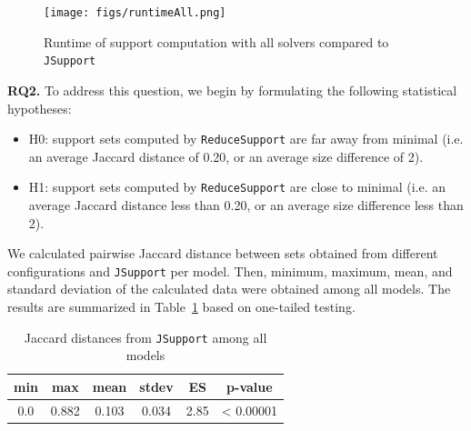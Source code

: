 \begin{figure}
  \centering
  \texttt{[image: figs/runtimeAll.png]}
  \caption{Runtime of support computation with all solvers compared to \texttt{JSupport}}\label{fig:runtimeall}
\end{figure}

 \vspace{6pt}
\noindent{}
 \vspace{6pt}

\textbf{RQ2.} To address this question,
we begin by formulating the following statistical hypotheses:
\begin{itemize}
  \item H0: support sets computed by \texttt{ReduceSupport} are far away from minimal (i.e. an average Jaccard distance of 0.20, or an average size difference of 2).
 \item H1: support sets computed by \texttt{ReduceSupport} are close to minimal (i.e. an average Jaccard distance less than 0.20, or an average size difference less than 2).
\end{itemize}
We calculated pairwise Jaccard distance between sets obtained from different configurations and \texttt{JSupport} per model. Then, minimum, maximum, mean, and standard deviation of the calculated data were obtained among all models. The results are summarized in Table~\ref{tab:jsupjac} based on one-tailed testing.

\begin{table}
  \centering
  \begin{tabular}{ |c|c|c|c|c|c| }
    \hline
     min & max & mean & stdev & ES & p-value\\[0.5ex]
    \hline
     0.0   & 0.882 & 0.103 & 0.034 & 2.85 & < 0.00001 \\[0.5ex]
    \hline
  \end{tabular}
  \caption{Jaccard distances from \texttt{JSupport} among all models}
  \label{tab:jsupjac}
\end{table}

